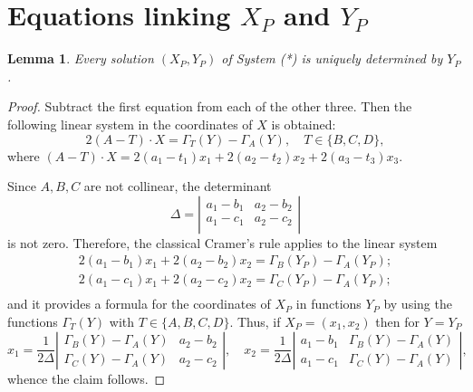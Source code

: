 \documentclass[10pt]{amsart}
\newtheorem{lem}[thm]{Lemma}
\theoremstyle{definition}
\theoremstyle{remark}
\begin{document}

\section{Equations linking $X_P$ and $Y_P$}
 \begin{lem}
\label{lemA18apr} Every solution $(X_P,Y_P)$ of System (*) is uniquely determined by $Y_P$.
\end{lem}
\begin{proof}
Subtract the first equation from each of the other three. Then the following linear system in the coordinates of $X$ is obtained:
\begin{equation}
\label{eq243} 2(A-T)\cdot X=\Gamma_T(Y)-\Gamma_A(Y), \quad T\in\{B,C,D\},
\end{equation}
where
$(A-T)\cdot X=2(a_1-t_1)x_1+2(a_2-t_2)x_2+2(a_3-t_3)x_3.$

Since $A,B,C$ are not collinear, the determinant
$$\Delta=\left|
  \begin{array}{cccc}
    a_1-b_1 & a_2-b_2   \\
    a_1-c_1 & a_2-c_2   \\
   \end{array}
\right|
$$
is not zero. Therefore, the classical Cramer's rule applies to the linear system
\begin{equation}
\label{eqB071224}
  \begin{array}{llll}
    2(a_1-b_1)x_1+ 2(a_2-b_2)x_2 = \Gamma_B(Y_P)-\Gamma_A(Y_P);\\
    2(a_1-c_1)x_1+ 2(a_2-c_2)x_2 =\Gamma_C(Y_P)-\Gamma_A(Y_P);\\
  \end{array}
\end{equation}
and it provides a formula for the coordinates of $X_P$ in functions $Y_P$ by using the functions $\Gamma_T(Y)$ with $T\in\{A,B,C,D\}$.
Thus, if $X_P=(x_1,x_2)$ then for $Y=Y_P$
\begin{equation}
\label{eqD071224}
x_1=\frac{1}{2\Delta} \left|\begin{array}{cccc}
\Gamma_B(Y)-\Gamma_A(Y)  & a_2-b_2  \\
\Gamma_C(Y)-\Gamma_A(Y) & a_2-c_2
  \end{array}\right|,
\quad
x_2=\frac{1}{2\Delta} \left|\begin{array}{ccccc}
a_1-b_1 &\Gamma_B(Y)-\Gamma_A(Y) \\
a_1-c_1 & \Gamma_C(Y)-\Gamma_A(Y)
  \end{array}\right|,
\end{equation}
whence the claim follows.
\end{proof}
\end{document}
